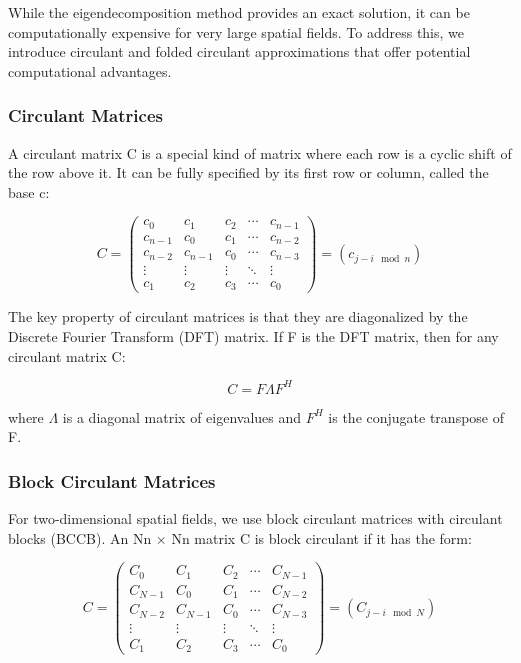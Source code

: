 \documentclass[journal=,manuscript=]{achemso}
\begin{document}
While the eigendecomposition method provides an exact solution, it can
be computationally expensive for very large spatial fields. To address
this, we introduce circulant and folded circulant approximations that
offer potential computational advantages.

\subsubsection{Circulant Matrices}\label{circulant-matrices}

A circulant matrix C is a special kind of matrix where each row is a
cyclic shift of the row above it. It can be fully specified by its first
row or column, called the base c:

\[
C = \begin{pmatrix}
c_0 & c_1 & c_2 & \cdots & c_{n-1} \\
c_{n-1} & c_0 & c_1 & \cdots & c_{n-2} \\
c_{n-2} & c_{n-1} & c_0 & \cdots & c_{n-3} \\
\vdots & \vdots & \vdots & \ddots & \vdots \\
c_1 & c_2 & c_3 & \cdots & c_0
\end{pmatrix} = (c_{j-i \mod n})
\]

The key property of circulant matrices is that they are diagonalized by
the Discrete Fourier Transform (DFT) matrix. If F is the DFT matrix,
then for any circulant matrix C:

\[
C = F \Lambda F^H
\]

where \(\Lambda\) is a diagonal matrix of eigenvalues and \(F^H\) is the
conjugate transpose of F.

\subsubsection{Block Circulant Matrices}\label{block-circulant-matrices}

For two-dimensional spatial fields, we use block circulant matrices with
circulant blocks (BCCB). An Nn × Nn matrix C is block circulant if it
has the form:

\[
C = \begin{pmatrix}
C_0 & C_1 & C_2 & \cdots & C_{N-1} \\
C_{N-1} & C_0 & C_1 & \cdots & C_{N-2} \\
C_{N-2} & C_{N-1} & C_0 & \cdots & C_{N-3} \\
\vdots & \vdots & \vdots & \ddots & \vdots \\
C_1 & C_2 & C_3 & \cdots & C_0
\end{pmatrix} = (C_{j-i \mod N})
\]
\end{document}

